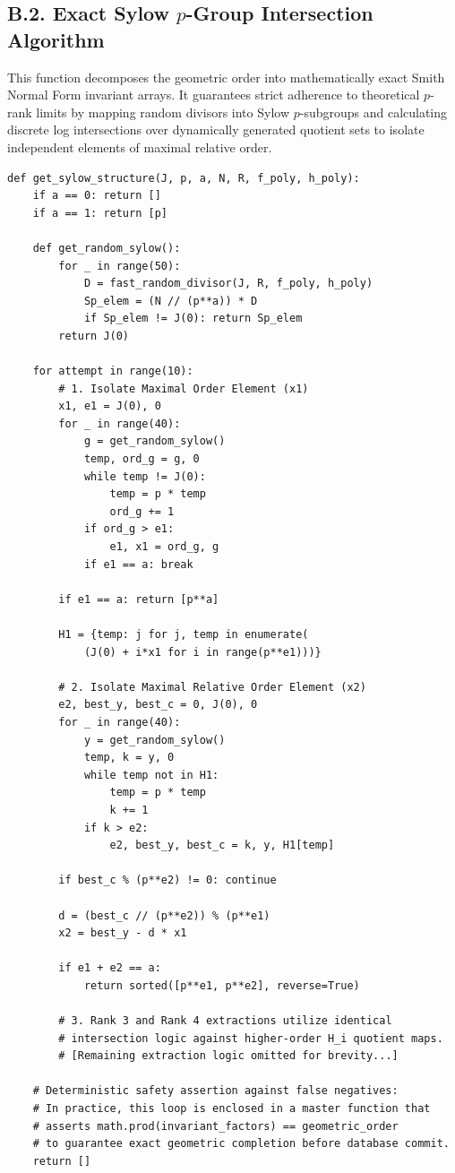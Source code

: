 \documentclass[letterpaper, 11pt]{article}
\begin{document}
\subsection{B.2. Exact Sylow \texorpdfstring{$p$}{p}-Group Intersection Algorithm}
This function decomposes the geometric order into mathematically exact Smith Normal Form invariant arrays. It guarantees strict adherence to theoretical $p$-rank limits by mapping random divisors into Sylow $p$-subgroups and calculating discrete log intersections over dynamically generated quotient sets to isolate independent elements of maximal relative order.

\begin{lstlisting}
def get_sylow_structure(J, p, a, N, R, f_poly, h_poly):
    if a == 0: return []
    if a == 1: return [p]
    
    def get_random_sylow():
        for _ in range(50):
            D = fast_random_divisor(J, R, f_poly, h_poly)
            Sp_elem = (N // (p**a)) * D
            if Sp_elem != J(0): return Sp_elem
        return J(0)
        
    for attempt in range(10): 
        # 1. Isolate Maximal Order Element (x1)
        x1, e1 = J(0), 0
        for _ in range(40):
            g = get_random_sylow()
            temp, ord_g = g, 0
            while temp != J(0):
                temp = p * temp
                ord_g += 1
            if ord_g > e1:
                e1, x1 = ord_g, g
            if e1 == a: break
        
        if e1 == a: return [p**a]
        
        H1 = {temp: j for j, temp in enumerate(
            (J(0) + i*x1 for i in range(p**e1)))}
            
        # 2. Isolate Maximal Relative Order Element (x2)
        e2, best_y, best_c = 0, J(0), 0
        for _ in range(40):
            y = get_random_sylow()
            temp, k = y, 0
            while temp not in H1:
                temp = p * temp
                k += 1
            if k > e2:
                e2, best_y, best_c = k, y, H1[temp]
                
        if best_c % (p**e2) != 0: continue 
            
        d = (best_c // (p**e2)) % (p**e1)
        x2 = best_y - d * x1
        
        if e1 + e2 == a:
            return sorted([p**e1, p**e2], reverse=True)
            
        # 3. Rank 3 and Rank 4 extractions utilize identical 
        # intersection logic against higher-order H_i quotient maps.
        # [Remaining extraction logic omitted for brevity...]
        
    # Deterministic safety assertion against false negatives:
    # In practice, this loop is enclosed in a master function that 
    # asserts math.prod(invariant_factors) == geometric_order
    # to guarantee exact geometric completion before database commit.
    return []
\end{lstlisting}
\end{document}

